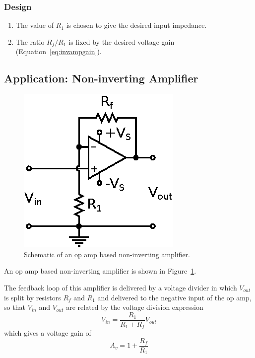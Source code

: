 \documentclass[11pt]{article}
\begin{document}
\subsubsection*{Design}
\begin{enumerate}
\item The value of $R_1$ is chosen to give the desired input
  impedance.

\item The ratio $R_f/R_1$ is fixed by the desired voltage gain
  (Equation~\ref{eq:invampgain}).
\end{enumerate}

\subsection{Application: Non-inverting Amplifier}
\label{sec:noninvertingamp}

\begin{figure}[ht]
  \begin{center}
    \includegraphics{noninvertingamp.eps}
    \caption{Schematic of an op amp based non-inverting amplifier.}
    \label{fig:noninvertingamp}
  \end{center}
\end{figure}

An op amp based non-inverting amplifier is shown in
Figure~\ref{fig:noninvertingamp}.

The feedback loop of this amplifier is delivered by a voltage divider
in which $V_{out}$ is split by resistors $R_f$ and $R_1$ and delivered
to the negative input of the op amp, so that $V_{in}$ and $V_{out}$
are related by the voltage division expression
\begin{equation}
  V_{in} = \frac{R_1}{R_1 + R_f} V_{out}
\end{equation}
which gives a voltage gain of
\begin{equation}
  A_v = 1 + \frac{R_f}{R_1}
  \label{eq:noninvampgain}
\end{equation}
\end{document}
